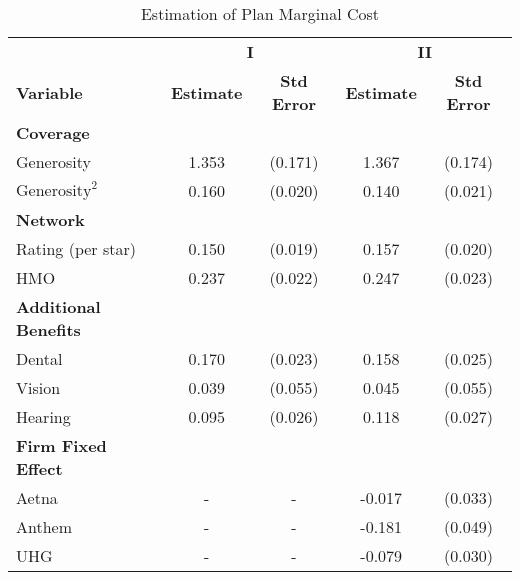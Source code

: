 \begin{table}[ht]\scriptsize
    \caption{Estimation of Plan Marginal Cost}
    \centering
    \begin{tabular}{lcccc}
    \toprule
    & \multicolumn{2}{c}{\textbf{I}} & \multicolumn{2}{c}{\textbf{II}} \\
    \multirow{1}{*}{\textbf{Variable}} & \textbf{Estimate} & \textbf{Std Error} & \textbf{Estimate} & \textbf{Std Error} \\
    \midrule
    \textbf{Coverage} & & & & \\
    Generosity & 1.353 & (0.171) & 1.367 & (0.174) \\
    $\text{Generosity}^2$ & 0.160 & (0.020) & 0.140 & (0.021) \\
    \midrule
    \textbf{Network} & & & & \\
    Rating (per star) & 0.150 & (0.019) & 0.157 & (0.020) \\
    HMO & 0.237 & (0.022) & 0.247 & (0.023) \\
    \midrule
    \textbf{Additional Benefits} & & & & \\
    Dental  & 0.170 & (0.023) & 0.158 & (0.025) \\
    Vision  & 0.039 & (0.055) & 0.045 & (0.055) \\
    Hearing  & 0.095 & (0.026) & 0.118 & (0.027) \\
    \midrule
    \textbf{Firm Fixed Effect} & & & & \\
    Aetna & - & - & -0.017 & (0.033) \\
    Anthem & - & - & -0.181 & (0.049) \\
    UHG & - & - & -0.079 & (0.030) \\
    \bottomrule
    \end{tabular}
\end{table}